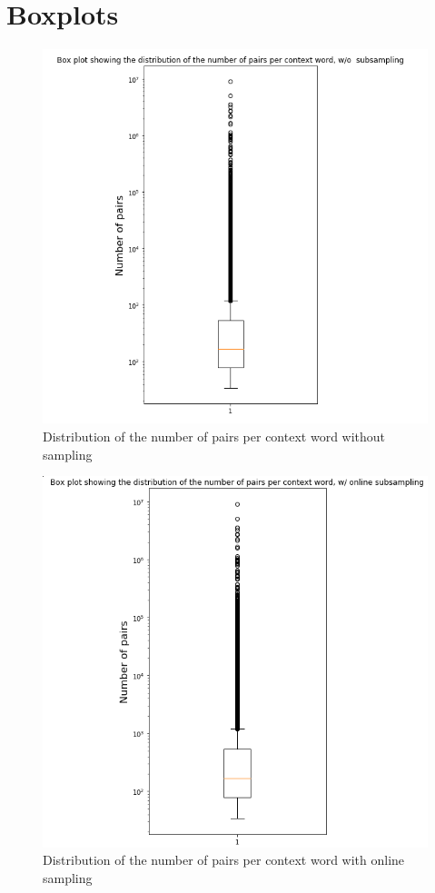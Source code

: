 \documentclass{scrartcl}
\begin{document}
\begin{figure}
\begin{minipage}{.3\textwidth}
  \label{fig:test2}
\end{minipage}
\end{figure}


\section{ Boxplots}
\begin{figure}[h!]
\caption{Distribution of the number of pairs per context word without sampling}
\includegraphics[scale=0.4]{no_sampling_boxplot}
\centering
\end{figure}

\begin{figure}[h!]
\caption{Distribution of the number of pairs per context word with online sampling}
\includegraphics[scale=0.4]{online_sampling_boxplot}
\centering
\end{figure}
\end{document}
